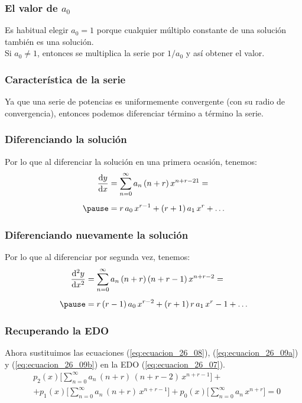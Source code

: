 \documentclass[12pt]{beamer}
\begin{document}
\begin{frame}
\frametitle{El valor de $a_{0}$}
Es habitual elegir $a_{0} = 1$ porque cualquier múltiplo constante de una solución también es una solución.
\\
\bigskip
\pause
Si $a_{0} \neq 1$, entonces se multiplica la serie por $1/a_{0}$ y así obtener el valor.
\end{frame}
\begin{frame}
\frametitle{Característica de la serie}
Ya que una serie de potencias es uniformemente convergente (con su radio de convergencia), entonces podemos diferenciar término a término la serie.
\end{frame}
\begin{frame}
\frametitle{Diferenciando la solución}
Por lo que al diferenciar la solución en una primera ocasión, tenemos:
\begin{eqnarray}
\begin{aligned}
\dv{y}{x} &= \sum_{n=0}^{\infty} a_{n} \, (n + r) \, x^{n+r-21} = \\[0.5em] \pause
&= r \, a_{0} \, x^{r-1} + (r + 1) \, a_{1} \, x^{r} + \ldots
\end{aligned}
\label{eq:ecuacion_26_09a}
\end{eqnarray}
\end{frame}
\begin{frame}
\frametitle{Diferenciando nuevamente la solución}
Por lo que al diferenciar por segunda vez, tenemos:
\begin{eqnarray}
\begin{aligned}
\dv[2]{y}{x} &= \sum_{n=0}^{\infty} a_{n} \, (n + r) \, (n + r - 1) \, x^{n+r-2} = \\[0.5em] \pause
&= r \, (r - 1) \, a_{0} \, x^{r-2} + (r + 1) \, r \, a_{1} \, x^{r}-1 + \ldots
\end{aligned}
\label{eq:ecuacion_26_09b}
\end{eqnarray}
\end{frame}
\begin{frame}
\frametitle{Recuperando la EDO}
Ahora sustituimos las ecuaciones (\ref{eq:ecuacion_26_08}), (\ref{eq:ecuacion_26_09a}) y (\ref{eq:ecuacion_26_09b}) en la EDO (\ref{eq:ecuacion_26_07}).
\pause
\begin{align*}
&p_{2}(x) \bigg[ \sum_{n=0}^{\infty} a_{n} \, (n + r) \, (n + r - 2) \, x^{n+r-1} \bigg] + \\[1em]
&+ p_{1} (x) \big[ \sum_{n=0}^{\infty} a_{n} \, (n + r) \, x^{n+r-1} \bigg] + p_{0}(x) \bigg[ \sum_{n=0}^{\infty} a_{n} \, x^{n+r} \bigg] = 0
\end{align*}
\end{frame}
\end{document}

